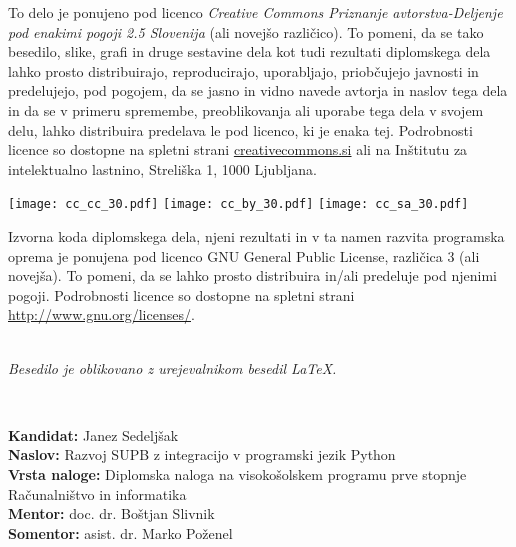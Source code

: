 \documentclass[a4paper,12pt,openright]{book}
\newcommand{\ttitle}{Razvoj SUPB z integracijo v programski jezik Python}
\newcommand{\clearemptydoublepage}{\newpage{\pagestyle{empty}\cleardoublepage}}
\newcommand{\CcImageCc}[1]{%
	\texttt{[image: cc\_cc\_30.pdf]}%
}
\newcommand{\CcImageBy}[1]{%
	\texttt{[image: cc\_by\_30.pdf]}%
}
\newcommand{\CcImageSa}[1]{%
	\texttt{[image: cc\_sa\_30.pdf]}%
}
\begin{document}
\newpage
\thispagestyle{empty}

\vspace*{5cm}
{\small \noindent
To delo je ponujeno pod licenco \textit{Creative Commons Priznanje avtorstva-Deljenje pod enakimi pogoji 2.5 Slovenija} (ali novej\v so razli\v cico).
To pomeni, da se tako besedilo, slike, grafi in druge sestavine dela kot tudi rezultati diplomskega dela lahko prosto distribuirajo,
reproducirajo, uporabljajo, priobčujejo javnosti in predelujejo, pod pogojem, da se jasno in vidno navede avtorja in naslov tega
dela in da se v primeru spremembe, preoblikovanja ali uporabe tega dela v svojem delu, lahko distribuira predelava le pod
licenco, ki je enaka tej.
Podrobnosti licence so dostopne na spletni strani \href{http://creativecommons.si}{creativecommons.si} ali na Inštitutu za
intelektualno lastnino, Streliška 1, 1000 Ljubljana.

\vspace*{1cm}
\begin{center}%
\CcImageCc{0.741573033707865}\hspace*{1ex}\CcImageBy{1}\hspace*{1ex}\CcImageSa{1}%
\end{center}
}

\vspace*{1cm}
{\small \noindent
Izvorna koda diplomskega dela, njeni rezultati in v ta namen razvita programska oprema je ponujena pod licenco GNU General Public License,
različica 3 (ali novejša). To pomeni, da se lahko prosto distribuira in/ali predeluje pod njenimi pogoji.
Podrobnosti licence so dostopne na spletni strani \url{http://www.gnu.org/licenses/}.
}

\vfill
\begin{center} 
\ \\ \vfill
{\em
Besedilo je oblikovano z urejevalnikom besedil \LaTeX.}
\end{center}

\clearemptydoublepage

\thispagestyle{empty}
\
\vfill

\bigskip
\noindent\textbf{Kandidat:} Janez Sedeljšak\\
\noindent\textbf{Naslov:} \ttitle \\
\noindent\textbf{Vrsta naloge:} Diplomska naloga na visokošolskem programu prve stopnje Računalništvo in informatika \\
\noindent\textbf{Mentor:} doc. dr. Boštjan Slivnik\\
\noindent\textbf{Somentor:} asist. dr. Marko Poženel\\
\end{document}
